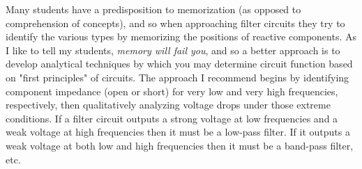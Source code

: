 Many students have a predisposition to memorization (as opposed to comprehension of concepts), and so when approaching filter circuits they try to identify the various types by memorizing the positions of reactive components.  As I like to tell my students, {\it memory will fail you}, and so a better approach is to develop analytical techniques by which you may determine circuit function based on "first principles" of circuits.  The approach I recommend begins by identifying component impedance (open or short) for very low and very high frequencies, respectively, then qualitatively analyzing voltage drops under those extreme conditions.  If a filter circuit outputs a strong voltage at low frequencies and a weak voltage at high frequencies then it must be a low-pass filter.  If it outputs a weak voltage at both low and high frequencies then it must be a band-pass filter, etc.



